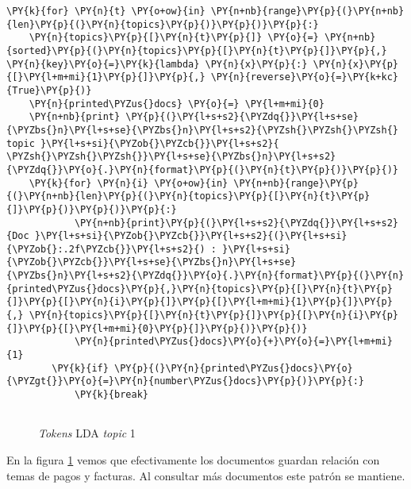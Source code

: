    \begin{tcolorbox}[breakable, size=fbox, boxrule=1pt, pad at break*=1mm,colback=cellbackground, colframe=cellborder]
\begin{Verbatim}[commandchars=\\\{\}]
\PY{k}{for} \PY{n}{t} \PY{o+ow}{in} \PY{n+nb}{range}\PY{p}{(}\PY{n+nb}{len}\PY{p}{(}\PY{n}{topics}\PY{p}{)}\PY{p}{)}\PY{p}{:}
    \PY{n}{topics}\PY{p}{[}\PY{n}{t}\PY{p}{]} \PY{o}{=} \PY{n+nb}{sorted}\PY{p}{(}\PY{n}{topics}\PY{p}{[}\PY{n}{t}\PY{p}{]}\PY{p}{,} \PY{n}{key}\PY{o}{=}\PY{k}{lambda} \PY{n}{x}\PY{p}{:} \PY{n}{x}\PY{p}{[}\PY{l+m+mi}{1}\PY{p}{]}\PY{p}{,} \PY{n}{reverse}\PY{o}{=}\PY{k+kc}{True}\PY{p}{)}
    \PY{n}{printed\PYZus{}docs} \PY{o}{=} \PY{l+m+mi}{0}
    \PY{n+nb}{print} \PY{p}{(}\PY{l+s+s2}{\PYZdq{}}\PY{l+s+se}{\PYZbs{}n}\PY{l+s+se}{\PYZbs{}n}\PY{l+s+s2}{\PYZsh{}\PYZsh{}\PYZsh{} topic }\PY{l+s+si}{\PYZob{}\PYZcb{}}\PY{l+s+s2}{ \PYZsh{}\PYZsh{}\PYZsh{}}\PY{l+s+se}{\PYZbs{}n}\PY{l+s+s2}{\PYZdq{}}\PY{o}{.}\PY{n}{format}\PY{p}{(}\PY{n}{t}\PY{p}{)}\PY{p}{)}
    \PY{k}{for} \PY{n}{i} \PY{o+ow}{in} \PY{n+nb}{range}\PY{p}{(}\PY{n+nb}{len}\PY{p}{(}\PY{n}{topics}\PY{p}{[}\PY{n}{t}\PY{p}{]}\PY{p}{)}\PY{p}{)}\PY{p}{:}
            \PY{n+nb}{print}\PY{p}{(}\PY{l+s+s2}{\PYZdq{}}\PY{l+s+s2}{Doc }\PY{l+s+si}{\PYZob{}\PYZcb{}}\PY{l+s+s2}{(}\PY{l+s+si}{\PYZob{}:.2f\PYZcb{}}\PY{l+s+s2}{) : }\PY{l+s+si}{\PYZob{}\PYZcb{}}\PY{l+s+se}{\PYZbs{}n}\PY{l+s+se}{\PYZbs{}n}\PY{l+s+s2}{\PYZdq{}}\PY{o}{.}\PY{n}{format}\PY{p}{(}\PY{n}{printed\PYZus{}docs}\PY{p}{,}\PY{n}{topics}\PY{p}{[}\PY{n}{t}\PY{p}{]}\PY{p}{[}\PY{n}{i}\PY{p}{]}\PY{p}{[}\PY{l+m+mi}{1}\PY{p}{]}\PY{p}{,} \PY{n}{topics}\PY{p}{[}\PY{n}{t}\PY{p}{]}\PY{p}{[}\PY{n}{i}\PY{p}{]}\PY{p}{[}\PY{l+m+mi}{0}\PY{p}{]}\PY{p}{)}\PY{p}{)}
            \PY{n}{printed\PYZus{}docs}\PY{o}{+}\PY{o}{=}\PY{l+m+mi}{1}
        \PY{k}{if} \PY{p}{(}\PY{n}{printed\PYZus{}docs}\PY{o}{\PYZgt{}}\PY{o}{=}\PY{n}{number\PYZus{}docs}\PY{p}{)}\PY{p}{:}
            \PY{k}{break}
            
\end{Verbatim}
\end{tcolorbox}




\begin{figure}[!ht]
	\centering
    \caption{\textit{Tokens} LDA \textit{topic} 1}
    \label{fig:lda_topic1}
\end{figure}

En la figura \ref{fig:lda_topic1} vemos que efectivamente los documentos guardan relación con temas de pagos y facturas. Al consultar más documentos este patrón se mantiene.

